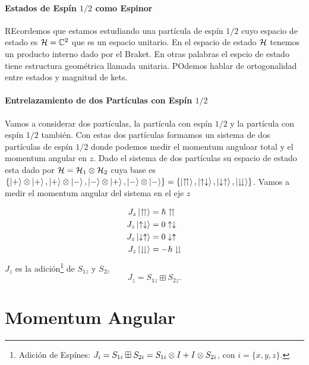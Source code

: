 \subsubsection{Estados de Espín $1/2$ como Espinor}
REcordemos que estamos estudiando una partícula de espín $1/2$ cuyo espacio de estado es $\mathcal{H} = \mathbb{C}^2$ que es un espacio unitario. En el espacio de estado $\mathcal{H}$  tenemos un producto interno dado por el Braket. En otras palabras el espcio de estado tiene estructura geométrica llamada unitaria. POdemos hablar de ortogonalidad entre estados y magnitud de kets. 



\subsubsection{Entrelazamiento de dos Partículas con Espín $1/2$}
Vamos a considerar dos partículas, la partícula con espín $1/2$ y la partícula con espín $1/2$ también. Con estas dos partículas formamos un sistema de dos partículas de espín $1/2$ donde podemos medir el momentum anguloar total y el momentum angular en $z$. Dado el sistema de dos partículas su espacio de estado esta dado por $\mathcal{H} = \mathcal{H} _1 \otimes \mathcal{H} _2$ cuya base es $\{ \ket{+} \otimes \ket{+}, \ket{+} \otimes \ket{-}, \ket{-} \otimes \ket{+}, \ket{-} \otimes \ket{-} \} = \{ \ket{\upuparrows}, \ket{\uparrow \downarrow}, \ket{\downarrow \uparrow}, \ket{\downdownarrows} \}$. Vamos a medir el momentum angular del sistema en el eje $z$ 

\begin{align*}
	J_z \ket{\upuparrows} &= \hbar \upuparrows \\
	J_z \ket{\uparrow \downarrow} &= 0 \uparrow \downarrow \\
	J_z \ket{\downarrow \uparrow} &= 0 \downarrow \uparrow \\
	J_z \ket{\downdownarrows} &= -\hbar \downdownarrows
\end{align*}
$J_z$ es la adición\footnote{Adición de Espínes: $J_{i} = S_{1i} \boxplus S_{2i} = S_{1i} \otimes I + I\otimes S_{2i}$, con $i = \{ x,y,z \}$.} de $S_{1z}$ y $S_{2z}$
\begin{equation}
	J_z = S_{1z} \boxplus S_{2z}.
\end{equation}








\chapter{Momentum Angular}

